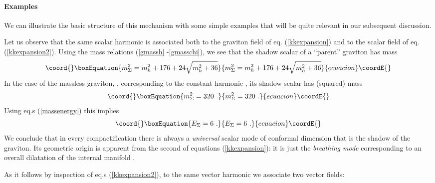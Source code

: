 \documentclass[a4paper,11pt]{article}
\begin{document}
\paragraph{Examples}
We can illustrate the basic structure of this mechanism with some
simple examples that will be quite relevant in our subsequent
discussion.
\par
Let us observe that the same scalar harmonic \coordHE{} is
associated both to the graviton field \coordHE{} of eq.
(\ref{kkexpansion}) and to the scalar field \coordHE{} of eq.
(\ref{kkexpansion2}). Using the mass relations (\ref{gmassh}
-\ref{gmasschi}), we see that the shadow scalar of a ``parent''
graviton has mass
\begin{equation}\coord{}\boxEquation{
  m_\Sigma^2 =m_h^2 +176 +24 \sqrt{m_h^2+36}
\label{shasca}
}{
  m_\Sigma^2 =m_h^2 +176 +24 \sqrt{m_h^2+36}
}{ecuacion}\coordE{}\end{equation}
In the case of the massless graviton, \coordHE{}, corresponding to
the constant harmonic \coordHE{}, its shadow scalar \myHighlight{$\Sigma$}\coordHE{} has
(squared) mass
\begin{equation}\coord{}\boxEquation{
  m^2_\Sigma = 320~.
\label{massigma}
}{
  m^2_\Sigma = 320~.
}{ecuacion}\coordE{}\end{equation}
Using eq.s (\ref{massenergy}) this implies
\begin{equation}\coord{}\boxEquation{
  E_\Sigma = 6~.
\label{Esigma}
}{
  E_\Sigma = 6~.
}{ecuacion}\coordE{}\end{equation}
We conclude that in every \coordHE{}
compactification there is always a \emph{universal} scalar mode of
conformal dimension \coordHE{} that is the shadow of the graviton. Its
geometric origin is apparent from the second of equations
(\ref{kkexpansion}): it is just the \emph{breathing mode}
corresponding to an overall dilatation of the internal manifold
\coordHE{}.
\par
As it follows by inspection of eq.s (\ref{kkexpansion2}), to the
same vector harmonic \coordHE{} we associate two vector fields:
\end{document}
